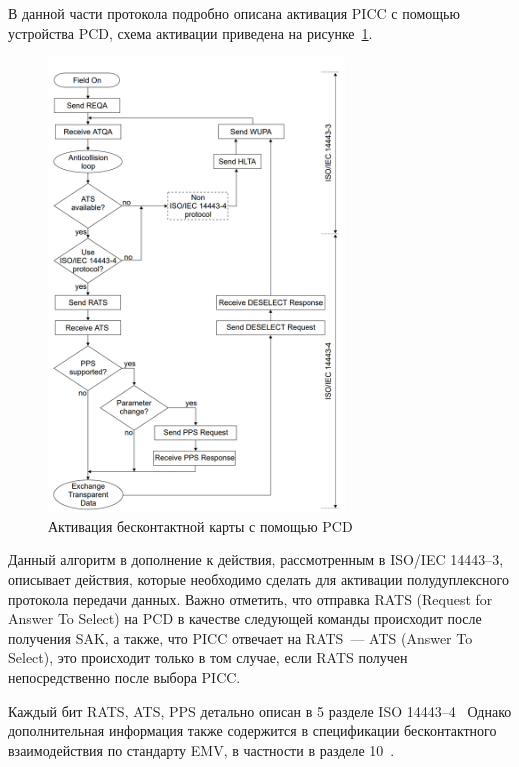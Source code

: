 В данной части протокола подробно описана активация PICC с помощью устройства PCD, схема активации приведена на рисунке~\ref{fig:pcd_flow_2_picc_activation}.


\begin{figure}[H]
    \centering
    \includegraphics[width=0.7\textwidth]{images/research/pcd_flow_2_picc_activation}
    \caption{\centering Активация бесконтактной карты с помощью PCD}
    \label{fig:pcd_flow_2_picc_activation}
\end{figure}

Данный алгоритм в дополнение к действия, рассмотренным в ISO/IEC 14443--3, описывает действия, которые необходимо сделать для активации полудуплексного протокола передачи данных.
Важно отметить, что отправка RATS (Request for Answer To Select) на PCD в качестве следующей команды происходит после получения SAK, а также, что PICC отвечает на RATS~--- ATS (Answer To Select), это происходит только в том случае, если RATS получен непосредственно после выбора PICC.

Каждый бит RATS, ATS, PPS детально описан в 5 разделе ISO 14443--4~\cite{iso14443-4} Однако дополнительная информация также содержится в спецификации бесконтактного взаимодействия по стандарту EMV, в частности в разделе 10~\cite{emv_specifications_book}.

